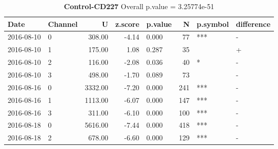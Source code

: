 \begin{table}[ht]
\caption[Control-CD227]{\textbf{Control-CD227} Overall p.value = 3.25774e-51}
\centering
\begin{tabular}{llrrlrll}
  \hline
Date & Channel & U & z.score & p.value & N & p.symbol & difference \\ 
  \hline
2016-08-10 & 0 & 308.00 & -4.14 & 0.000 &  77 & *** & - \\ 
  2016-08-10 & 1 & 175.00 & 1.08 & 0.287 &  35 &  & + \\ 
  2016-08-10 & 2 & 116.00 & -2.08 & 0.036 &  40 & * & - \\ 
  2016-08-10 & 3 & 498.00 & -1.70 & 0.089 &  73 &  & - \\ 
  2016-08-16 & 0 & 3332.00 & -7.20 & 0.000 & 241 & *** & - \\ 
  2016-08-16 & 1 & 1113.00 & -6.07 & 0.000 & 147 & *** & - \\ 
  2016-08-16 & 3 & 311.00 & -6.10 & 0.000 & 100 & *** & - \\ 
  2016-08-18 & 0 & 5616.00 & -7.44 & 0.000 & 418 & *** & - \\ 
  2016-08-18 & 2 & 678.00 & -6.60 & 0.000 & 129 & *** & - \\ 
   \hline
\end{tabular}
\end{table}
